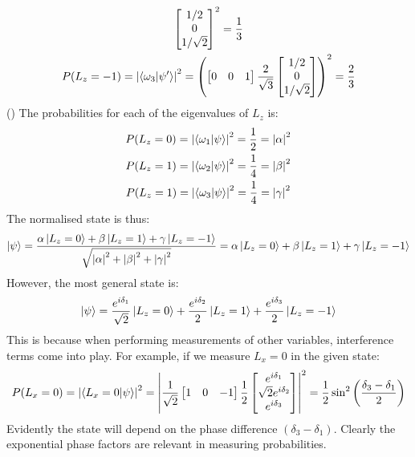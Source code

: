 \documentclass{report}
\theoremstyle{definition}
\newcounter{subpart1}[chapter1]
\begin{document}
\begin{chapter4}
\begin{gather*}
{			\begin{bmatrix}
				1/2 \\
				0 \\
				1/\sqrt{2}
			\end{bmatrix}}^2 = \frac{1}{3} \\
			P(L_z = -1) = \abs{\braket{\omega_3}{\psi '}}^2 =
			\pqty{\begin{bmatrix}
				 0 & 0 & 1
			\end{bmatrix}
			\frac{2}{\sqrt 3}
			\begin{bmatrix}
				1/2 \\
				0 \\
				1/\sqrt{2}
			\end{bmatrix}}^2 = \frac{2}{3}
		\end{gather*}
		()
		The probabilities for each of the eigenvalues of $L_z$ is:
		\begin{gather*}
			P(L_z = 0) = \abs{\braket{\omega_1}{\psi}}^2 = \frac{1}{2} = \abs{\alpha}^2 \\
			P(L_z = 1) = \abs{\braket{\omega_2}{\psi}}^2 = \frac{1}{4} = \abs{\beta}^2 \\
			P(L_z = 1) = \abs{\braket{\omega_3}{\psi}}^2 = \frac{1}{4} = \abs{\gamma}^2
		\end{gather*}
		The normalised state is thus:
		\begin{gather*}
			\ket{\psi} =  \frac{\alpha\ket{L_z = 0} + \beta\ket{L_z = 1} + \gamma\ket{L_z = -1}}{\sqrt{\abs{\alpha}^2 + \abs{\beta}^2 + \abs{\gamma}^2}} = \alpha\ket{L_z = 0} + \beta\ket{L_z = 1} + \gamma\ket{L_z = -1}
		\end{gather*}
		However, the most general state is:
		\begin{gather*}
			\ket{\psi} =  \frac{e^{i\delta_1}}{\sqrt{2}}\ket{L_z = 0} +\frac{e^{i\delta_2}}{2}\ket{L_z = 1} + \frac{e^{i\delta_3}}{2}\ket{L_z = -1}
		\end{gather*}
		This is because when performing measurements of other variables, interference terms come into play. For example, if we measure $L_x = 0$ in the given state:
		\begin{gather*}
			P(L_x = 0) = \abs{\braket{L_x = 0}{\psi}}^2 =
			\abs{\frac{1}{\sqrt{2}}
			\begin{bmatrix}
				1 & 0 & -1
			\end{bmatrix}
			\frac{1}{2}
			\begin{bmatrix}
				e^{i\delta_1} \\
				\sqrt{2}e^{i\delta_2} \\
				e^{i\delta_3}
			\end{bmatrix}}^2
			= \frac{1}{2}\sin^2\pqty{\frac{\delta_3 - \delta_1}{2}}
		\end{gather*}
		Evidently the state will depend on the phase difference $(\delta_3 - \delta_1)$. Clearly the exponential phase factors are relevant in measuring probabilities.
\end{chapter4}
\end{document}
